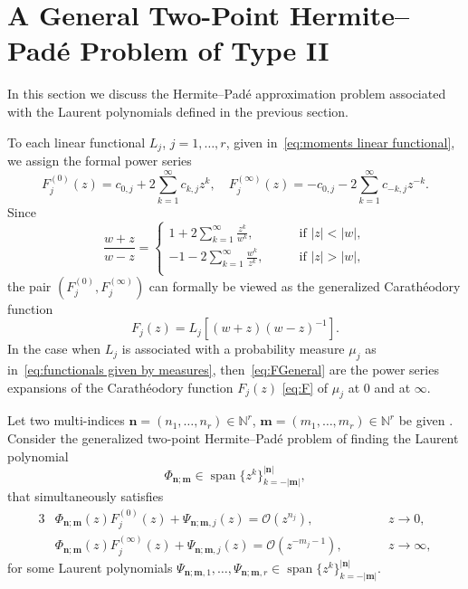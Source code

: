 \documentclass[reqno,centertags,11pt,draft]{amsart}
\newcommand{\N}{\mathbb{N}}
\newcommand{\abs}[1]{\left|#1\right|}
\begin{document}
\section{A General Two-Point Hermite--Pad\'e Problem of Type II}\label{ss:general type II hermite pade}

In this section we discuss the Hermite--Pad\'{e} approximation problem associated with the Laurent polynomials defined in the previous section.  

To each linear functional $L_j$, $j=1,\dots,r$, given in~\eqref{eq:moments linear functional}, we assign the formal power series
\begin{equation}
\label{eq:FGeneral}
    F_j^{(0)}(z) = c_{0,j} + 2\sum_{k = 1}^{\infty}c_{k,j}z^k, \quad F_j^{(\infty)}(z) = -c_{0,j} - 2\sum_{k = 1}^{\infty}c_{-k,j}z^{-k}.
\end{equation}
Since
\begin{equation}\label{eq:kernel}
        \frac{w+z}{w-z}
        =
        \begin{cases}
            1+ 2\sum_{k=1}^\infty \frac{z^k}{w^k},\qquad  & \mbox{if } |z|<|w|, \\
            -1 - 2\sum_{k=1}^\infty \frac{w^k}{z^k}, \qquad & \mbox{if } |z|>|w|, \\
        \end{cases}
\end{equation} 
the pair $(F_j^{(0)},F_j^{(\infty)})$ can formally be viewed as the generalized Carath\'{e}odory function
\begin{equation}\label{eq:generalized caratheodory function}
    F_j(z) = L_j[(w+z)(w-z)^{-1}].
\end{equation} 
In the case when $L_j$ is associated with a probability measure $\mu_j$ as in~\eqref{eq:functionals given by measures}, then~\eqref{eq:FGeneral} are the power series expansions of the Carath\'{e}odory function $F_j(z)$ \eqref{eq:F} of $\mu_j$ at $0$ and at $\infty$. 

Let two multi-indices $\bm{n} = (n_1,\dots,n_r)\in\N^r$, $\bm{m} = (m_1,\dots,m_r)\in\N^r$ %
be given%
. Consider the generalized two-point Hermite--Pad\'e problem of finding the Laurent polynomial
\begin{equation}\label{eq:spanFull}
    \Phi_{\bm{n};\bm{m}}
    \in \operatorname{span}\big\{z^k\big\}_{k = -\abs{\bm{m}}}^{\abs{\bm{n}}},
\end{equation}
that simultaneously satisfies
\begin{alignat}{3}
\label{eq:generalized two point hermite pade eq 1}
    & \Phi_{\bm{n};\bm{m}}(z)F_j^{(0)}(z) + \Psi_{\bm{n};\bm{m},j}(z) = \mathcal{O}(z^{n_j}),  \qquad &&z \rightarrow 0, \\\label{eq:generalized two point hermite pade eq 2}
    & \Phi_{\bm{n};\bm{m}}(z)F_j^{(\infty)}(z) + \Psi_{\bm{n};\bm{m},j}(z) = \mathcal{O}(z^{-m_j-1}), \qquad &&z \rightarrow \infty,
\end{alignat}
for some Laurent polynomials $\Psi_{\bm{n};\bm{m},1},\ldots,\Psi_{\bm{n};\bm{m},r} \in \operatorname{span}\big\{z^k\big\}_{k = -\abs{\bm{m}}}^{\abs{\bm{n}}}$.
\end{document}
